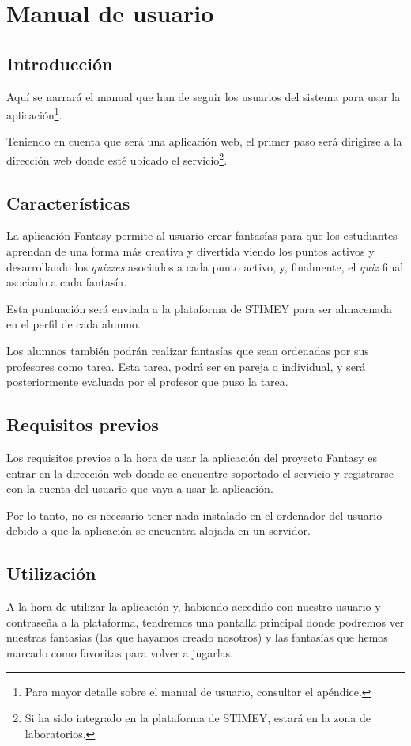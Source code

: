 \chapter{Manual de usuario}
\section{Introducción}

Aquí se narrará el manual que han de seguir los usuarios del sistema para usar la aplicación\footnote{Para mayor detalle sobre el manual de usuario, consultar el apéndice.}.

Teniendo en cuenta que será una aplicación web, el primer paso será dirigirse a la dirección web donde esté ubicado el servicio\footnote{Si ha sido integrado en la plataforma de STIMEY, estará en la zona de laboratorios.}.


\section{Características}

La aplicación Fantasy permite al usuario crear fantasías para que los estudiantes aprendan de una forma más creativa y divertida viendo los puntos activos y desarrollando los \textit{quizzes} asociados a cada punto activo, y, finalmente, el \textit{quiz} final asociado a cada fantasía.


Esta puntuación será enviada a la plataforma de STIMEY para ser almacenada en el perfil de cada alumno.


Los alumnos también podrán realizar fantasías que sean ordenadas por sus profesores como tarea. Esta tarea, podrá ser en pareja o individual, y será posteriormente evaluada por el profesor que puso la tarea.


\section{Requisitos previos}

Los requisitos previos a la hora de usar la aplicación del proyecto Fantasy es entrar en la dirección web donde se encuentre soportado el servicio y registrarse con la cuenta del usuario que vaya a usar la aplicación.


Por lo tanto, no es necesario tener nada instalado en el ordenador del usuario debido a que la aplicación se encuentra alojada en un servidor.


\section{Utilización}
A la hora de utilizar la aplicación y, habiendo accedido con nuestro usuario y contraseña a la plataforma, tendremos una pantalla principal donde podremos ver nuestras fantasías (las que hayamos creado nosotros) y las fantasías que hemos marcado como favoritas para volver a jugarlas.


